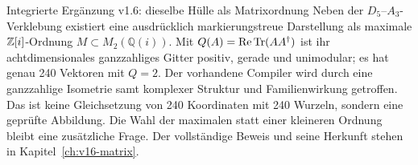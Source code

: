 \begin{bild}{Integrierte Ergänzung v1.6: dieselbe Hülle als Matrixordnung}
Neben der $D_5$--$A_3$-Verklebung existiert eine ausdrücklich markierungstreue Darstellung als maximale $\mathbb Z[i]$-Ordnung $M\subset M_2(\mathbb Q(i))$. Mit $Q(A)=\operatorname{Re}\operatorname{Tr}(AA^\dagger)$ ist ihr achtdimensionales ganzzahliges Gitter positiv, gerade und unimodular; es hat genau 240 Vektoren mit $Q=2$. Der vorhandene Compiler wird durch eine ganzzahlige Isometrie samt komplexer Struktur und Familienwirkung getroffen. Das ist keine Gleichsetzung von 240 Koordinaten mit 240 Wurzeln, sondern eine geprüfte Abbildung. Die Wahl der maximalen statt einer kleineren Ordnung bleibt eine zusätzliche Frage. Der vollständige Beweis und seine Herkunft stehen in Kapitel~\ref{ch:v16-matrix}.
\end{bild}
